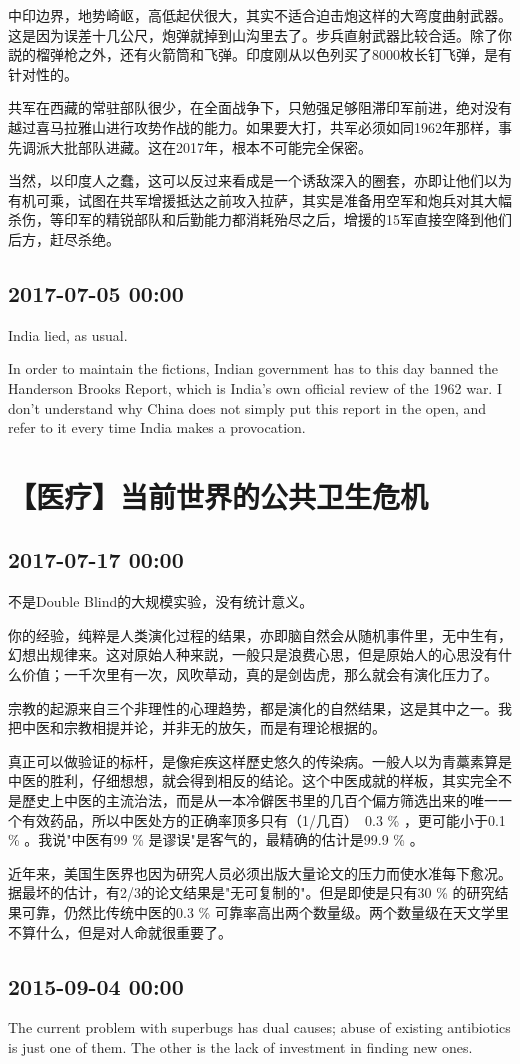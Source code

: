 \documentclass[twocolumn]{ctexart}
\begin{document}
中印边界，地势崎岖，高低起伏很大，其实不适合迫击炮这样的大弯度曲射武器。这是因为误差十几公尺，炮弹就掉到山沟里去了。步兵直射武器比较合适。除了你説的榴弹枪之外，还有火箭筒和飞弹。印度刚从以色列买了8000枚长钉飞弹，是有针对性的。

共军在西藏的常驻部队很少，在全面战争下，只勉强足够阻滞印军前进，绝对没有越过喜马拉雅山进行攻势作战的能力。如果要大打，共军必须如同1962年那样，事先调派大批部队进藏。这在2017年，根本不可能完全保密。

当然，以印度人之蠢，这可以反过来看成是一个诱敌深入的圈套，亦即让他们以为有机可乘，试图在共军增援抵达之前攻入拉萨，其实是准备用空军和炮兵对其大幅杀伤，等印军的精锐部队和后勤能力都消耗殆尽之后，增援的15军直接空降到他们后方，赶尽杀绝。\subsection*{2017-07-05 00:00}
India lied, as usual.

In order to maintain the fictions, Indian government has to this day banned the Handerson Brooks Report, which is India's own official review of the 1962 war. I don't understand why China does not simply put this report in the open, and refer to it every time India makes a provocation.\section*{【医疗】当前世界的公共卫生危机}
\subsection*{2017-07-17 00:00}
不是Double Blind的大规模实验，没有统计意义。

你的经验，纯粹是人类演化过程的结果，亦即脑自然会从随机事件里，无中生有，幻想出规律来。这对原始人种来説，一般只是浪费心思，但是原始人的心思没有什么价值；一千次里有一次，风吹草动，真的是剑齿虎，那么就会有演化压力了。

宗教的起源来自三个非理性的心理趋势，都是演化的自然结果，这是其中之一。我把中医和宗教相提并论，并非无的放矢，而是有理论根据的。

真正可以做验证的标杆，是像疟疾这样歷史悠久的传染病。一般人以为青藁素算是中医的胜利，仔细想想，就会得到相反的结论。这个中医成就的样板，其实完全不是歷史上中医的主流治法，而是从一本冷僻医书里的几百个偏方筛选出来的唯一一个有效药品，所以中医处方的正确率顶多只有（1/几百）~0.3 \% ，更可能小于0.1 \% 。我说"中医有99 \% 是谬误"是客气的，最精确的估计是99.9 \% 。

近年来，美国生医界也因为研究人员必须出版大量论文的压力而使水准每下愈况。据最坏的估计，有2/3的论文结果是"无可复制的"。但是即使是只有30 \% 的研究结果可靠，仍然比传统中医的0.3 \% 可靠率高出两个数量级。两个数量级在天文学里不算什么，但是对人命就很重要了。\subsection*{2015-09-04 00:00}
The current problem with superbugs has dual causes; abuse of existing antibiotics is just one of them. The other is the lack of investment in finding new ones.
\end{document}
